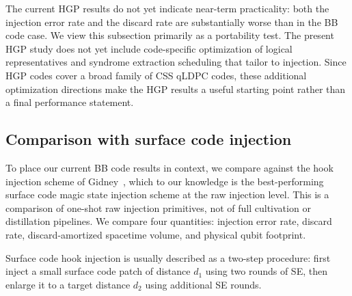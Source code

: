 The current HGP results do not yet indicate near-term practicality: both the injection error rate and the discard rate are substantially worse than in the BB code case. We view this subsection primarily as a portability test. The present HGP study does not yet include code-specific optimization of logical representatives and syndrome extraction scheduling that tailor to injection. Since HGP codes cover a broad family of CSS qLDPC codes, these additional optimization directions make the HGP results a useful starting point rather than a final performance statement.

\subsection{Comparison with surface code injection}

To place our current BB code results in context, we compare against the hook injection scheme of Gidney~\cite{gidney_cleaner_2023}, which to our knowledge is the best-performing surface code magic state injection scheme at the raw injection level. This is a comparison of one-shot raw injection primitives, not of full cultivation or distillation pipelines. We compare four quantities: injection error rate, discard rate, discard-amortized spacetime volume, and physical qubit footprint.

Surface code hook injection is usually described as a two-step procedure: first inject a small surface code patch of distance $d_1$ using two rounds of SE, then enlarge it to a target distance $d_2$ using additional SE rounds.

